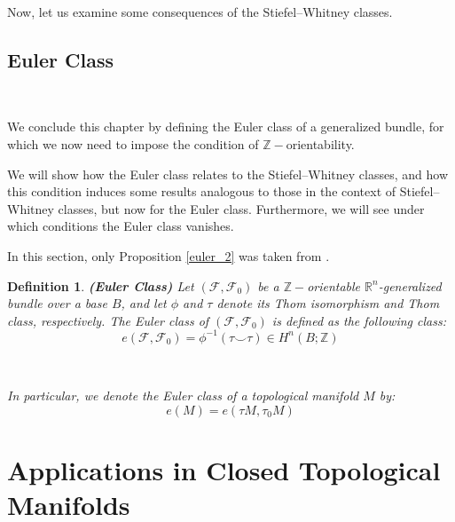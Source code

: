 \documentclass[12pt,oneside]{book}
\newtheorem{defi}   {Definition}[chapter]
\newcommand{\R}{\mathbb{R}}
\newcommand{\Z}{\mathbb{Z}}
\newcommand{\ccup}{\smile}
\begin{document}
    Now, let us examine some consequences of the Stiefel–Whitney classes.













    \section{Euler Class}\label{secao_euler}

    \

    We conclude this chapter by defining the Euler class of a generalized bundle, for which we now need to impose the condition of 
    $\Z-$orientability.

    We will show how the Euler class relates to the Stiefel–Whitney classes, and how this condition induces some 
    results analogous to those in the context of Stiefel–Whitney classes, but now for the Euler class. Furthermore, we will see under which 
    conditions the Euler class vanishes.

    In this section, only Proposition \ref{euler_2} was taken from \cite{fadell_1}.

    \begin{defi}{\bf (Euler Class)}
    	Let $(\mathcal{F},\mathcal{F}_{0})$ be a $\Z-$orientable $\R^{n}$-generalized bundle over a base 
        $B$, and let $\phi$ and $\tau$ denote its Thom isomorphism and Thom class, respectively. 
        The Euler class of $(\mathcal{F},\mathcal{F}_{0})$ is defined as the following class:
    	$$ e(\mathcal{F},\mathcal{F}_{0}) = \phi^{-1}(\tau \ccup \tau) \in H^{n}(B;\Z) $$

        \

    	In particular, we denote the Euler class of a topological manifold $M$ by:
    	$$ e(M) = e(\tau M, \tau_{0} M) $$
    \end{defi}













    \chapter{Applications in Closed Topological Manifolds}\label{cap_aplic}
    \thispagestyle{empty}
\end{document}
